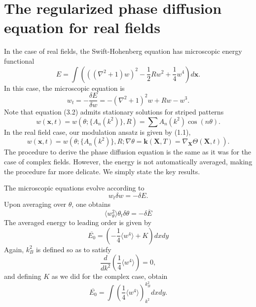 \documentclass[12pt]{article}
\numberwithin{equation}{section}
\begin{document}
\section{The regularized phase diffusion equation for real fields}
In the case of real fields, the Swift-Hohenberg equation has microscopic energy functional
\begin{equation}
    E = \int \left( ((\nabla^2+1)w)^2-\frac{1}{2}Rw^2 + \frac{1}{4}w^4 \right)d\bm{x}.
\end{equation}
In this case, the microscopic equation is
\begin{equation}
    w_t = -\frac{\delta E}{\delta w} = -(\nabla^2+1)^2w + Rw - w^3.
\end{equation}
Note that equation (3.2) admits stationary solutions for striped patterns
\begin{equation}
    w(\bm{x},t) = w(\theta; \{A_n(k^2)\},R) = \sum A_n(k^2)\cos(n\theta).
\end{equation}
In the real field case, our modulation ansatz is given by (1.1),
\begin{equation}
    w(\bm{x},t) = w(\theta; \{A_n(k^2)\},R; \nabla \theta = \bm{k}(\bm{X},T)=\nabla_{\bm{X}}\Theta(\bm{X},t)).
\end{equation}
The procedure to derive the phase diffusion equation is the same as it was for the case of complex fields. However, the energy is not automatically averaged, making the procedure far more delicate. We simply state the key results.
\par 
 The microscopic equations evolve according to
 \begin{equation}
     w_t \delta w = -\delta E.
 \end{equation}
 Upon averaging over $\theta$, one obtains
 \begin{equation}
     \langle w_{\theta}^2\rangle\theta_t \delta \theta = -\delta \overline{E}
 \end{equation}
 The averaged energy to leading order is given by
\begin{equation}
    \overline{E_0} = \left(-\frac{1}{4}\langle w^4 \rangle + K \right)dxdy
\end{equation}
Again, $k^2_B$ is defined so as to satisfy
\begin{equation}
    \frac{d}{dk^2}\left(\frac{1}{4}\langle w^4 \rangle\right) = 0, 
\end{equation}
and defining $K$ as we did for the complex case, obtain
\begin{equation}
    \overline{E_0} = \int \left( \frac{1}{4}\langle w^4 \rangle\right)_{k^2}^{k^2_B}dxdy.
\end{equation}
\end{document}
